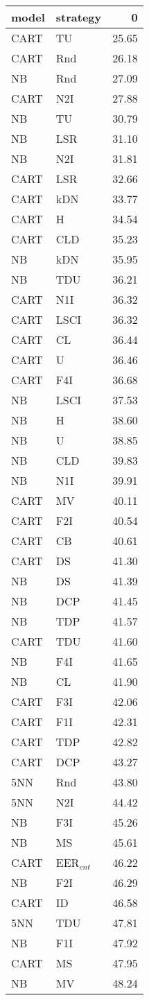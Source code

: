 \begin{tabular}{llr}
\toprule
model & strategy & 0 \\
\midrule
CART & TU & 25.65 \\
CART & Rnd & 26.18 \\
NB & Rnd & 27.09 \\
CART & N2I & 27.88 \\
NB & TU & 30.79 \\
NB & LSR & 31.10 \\
NB & N2I & 31.81 \\
CART & LSR & 32.66 \\
CART & kDN & 33.77 \\
CART & H & 34.54 \\
CART & CLD & 35.23 \\
NB & kDN & 35.95 \\
NB & TDU & 36.21 \\
CART & N1I & 36.32 \\
CART & LSCI & 36.32 \\
CART & CL & 36.44 \\
CART & U & 36.46 \\
CART & F4I & 36.68 \\
NB & LSCI & 37.53 \\
NB & H & 38.60 \\
NB & U & 38.85 \\
NB & CLD & 39.83 \\
NB & N1I & 39.91 \\
CART & MV & 40.11 \\
CART & F2I & 40.54 \\
CART & CB & 40.61 \\
CART & DS & 41.30 \\
NB & DS & 41.39 \\
NB & DCP & 41.45 \\
NB & TDP & 41.57 \\
CART & TDU & 41.60 \\
NB & F4I & 41.65 \\
NB & CL & 41.90 \\
CART & F3I & 42.06 \\
CART & F1I & 42.31 \\
CART & TDP & 42.82 \\
CART & DCP & 43.27 \\
5NN & Rnd & 43.80 \\
5NN & N2I & 44.42 \\
NB & F3I & 45.26 \\
NB & MS & 45.61 \\
CART & EER$_{ent}$ & 46.22 \\
NB & F2I & 46.29 \\
CART & ID & 46.58 \\
5NN & TDU & 47.81 \\
NB & F1I & 47.92 \\
CART & MS & 47.95 \\
NB & MV & 48.24 \\
\bottomrule
\end{tabular}
